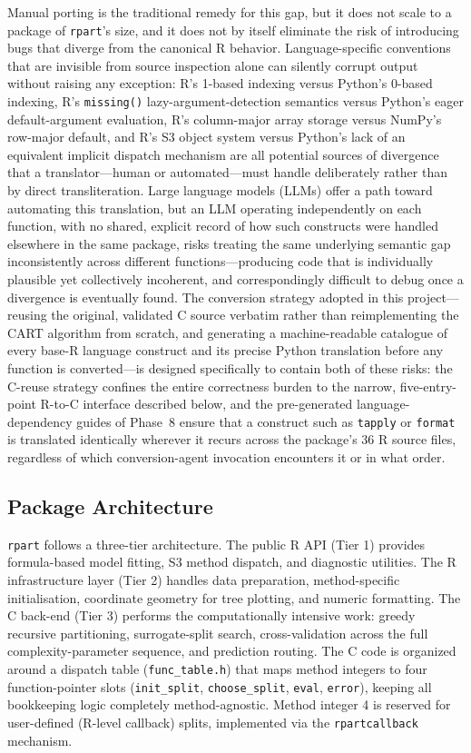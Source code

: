 \documentclass[12pt]{article}
\begin{document}
Manual porting is the traditional remedy for this gap, but it does not scale to a package of \texttt{rpart}'s size, and it does not by itself eliminate the risk of introducing bugs that diverge from the canonical R behavior. Language-specific conventions that are invisible from source inspection alone can silently corrupt output without raising any exception: R's 1-based indexing versus Python's 0-based indexing, R's \texttt{missing()} lazy-argument-detection semantics versus Python's eager default-argument evaluation, R's column-major array storage versus NumPy's row-major default, and R's S3 object system versus Python's lack of an equivalent implicit dispatch mechanism are all potential sources of divergence that a translator---human or automated---must handle deliberately rather than by direct transliteration. Large language models (LLMs) offer a path toward automating this translation, but an LLM operating independently on each function, with no shared, explicit record of how such constructs were handled elsewhere in the same package, risks treating the same underlying semantic gap inconsistently across different functions---producing code that is individually plausible yet collectively incoherent, and correspondingly difficult to debug once a divergence is eventually found. The conversion strategy adopted in this project---reusing the original, validated C source verbatim rather than reimplementing the CART algorithm from scratch, and generating a machine-readable catalogue of every base-R language construct and its precise Python translation before any function is converted---is designed specifically to contain both of these risks: the C-reuse strategy confines the entire correctness burden to the narrow, five-entry-point R-to-C interface described below, and the pre-generated language-dependency guides of Phase~8 ensure that a construct such as \texttt{tapply} or \texttt{format} is translated identically wherever it recurs across the package's 36 R source files, regardless of which conversion-agent invocation encounters it or in what order.

\subsection{Package Architecture}
\label{sec:intro:arch}

\texttt{rpart} follows a three-tier architecture. The public R API (Tier 1) provides formula-based model fitting, S3 method dispatch, and diagnostic utilities. The R infrastructure layer (Tier 2) handles data preparation, method-specific initialisation, coordinate geometry for tree plotting, and numeric formatting. The C back-end (Tier 3) performs the computationally intensive work: greedy recursive partitioning, surrogate-split search, cross-validation across the full complexity-parameter sequence, and prediction routing. The C code is organized around a dispatch table (\texttt{func\_table.h}) that maps method integers to four function-pointer slots (\texttt{init\_split}, \texttt{choose\_split}, \texttt{eval}, \texttt{error}), keeping all bookkeeping logic completely method-agnostic. Method integer 4 is reserved for user-defined (R-level callback) splits, implemented via the \texttt{rpartcallback} mechanism.
\end{document}
